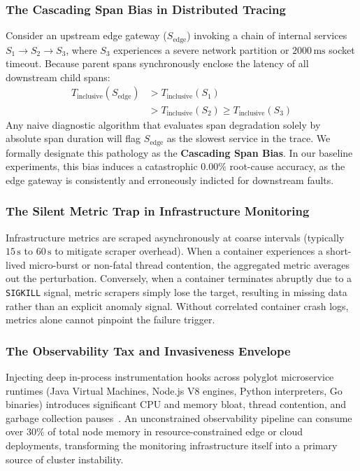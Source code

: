 \subsubsection{The Cascading Span Bias in Distributed Tracing}
Consider an upstream edge gateway ($S_{\text{edge}}$) invoking a chain of internal services $S_1 \rightarrow S_2 \rightarrow S_3$, where $S_3$ experiences a severe network partition or $2000\,\text{ms}$ socket timeout. Because parent spans synchronously enclose the latency of all downstream child spans:
\begin{equation}
\begin{split}
    T_{\text{inclusive}}(S_{\text{edge}}) &> T_{\text{inclusive}}(S_1) \\
    &> T_{\text{inclusive}}(S_2) \ge T_{\text{inclusive}}(S_3)
\end{split}
\end{equation}
Any naive diagnostic algorithm that evaluates span degradation solely by absolute span duration will flag $S_{\text{edge}}$ as the slowest service in the trace. We formally designate this pathology as the \textbf{Cascading Span Bias}. In our baseline experiments, this bias induces a catastrophic $0.00\%$ root-cause accuracy, as the edge gateway is consistently and erroneously indicted for downstream faults.

\subsubsection{The Silent Metric Trap in Infrastructure Monitoring}
Infrastructure metrics are scraped asynchronously at coarse intervals (typically $15\,\text{s}$ to $60\,\text{s}$ to mitigate scraper overhead). When a container experiences a short-lived micro-burst or non-fatal thread contention, the aggregated metric averages out the perturbation. Conversely, when a container terminates abruptly due to a \texttt{SIGKILL} signal, metric scrapers simply lose the target, resulting in missing data rather than an explicit anomaly signal. Without correlated container crash logs, metrics alone cannot pinpoint the failure trigger.

\subsubsection{The Observability Tax and Invasiveness Envelope}
Injecting deep in-process instrumentation hooks across polyglot microservice runtimes (Java Virtual Machines, Node.js V8 engines, Python interpreters, Go binaries) introduces significant CPU and memory bloat, thread contention, and garbage collection pauses~\cite{vancamp24, valbusa_2025}. An unconstrained observability pipeline can consume over $30\%$ of total node memory in resource-constrained edge or cloud deployments, transforming the monitoring infrastructure itself into a primary source of cluster instability.

